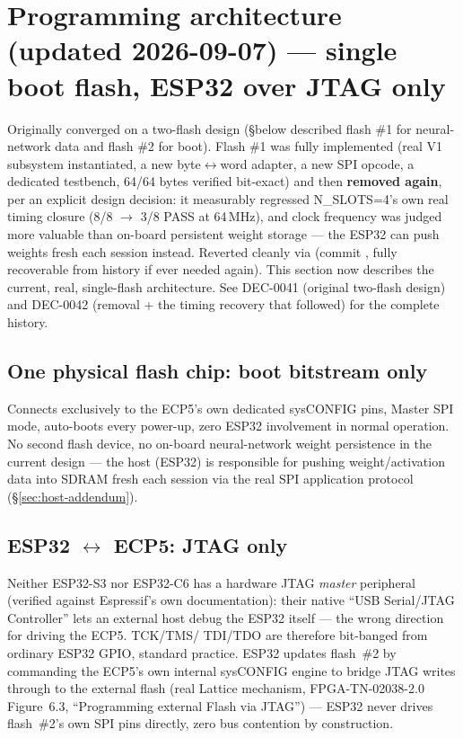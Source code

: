 \section{Programming architecture (updated 2026-09-07) --- single
boot flash, ESP32 over JTAG only}
\label{sec:prog-addendum}
\begin{fnwarn}
Originally converged on a two-flash design (\S below described flash
\#1 for neural-network data and flash \#2 for boot). Flash \#1 was
fully implemented (real V1 subsystem instantiated, a new byte$\leftrightarrow$word
adapter, a new SPI opcode, a dedicated testbench, 64/64 bytes verified
bit-exact) and then \textbf{removed again}, per an explicit design
decision: it measurably regressed N\_SLOTS=4's own real timing
closure (8/8 $\to$ 3/8 PASS at 64\,MHz), and clock frequency was
judged more valuable than on-board persistent weight storage --- the
ESP32 can push weights fresh each session instead. Reverted cleanly
via  (commit , fully recoverable from
history if ever needed again). This section now describes the
current, real, single-flash architecture. See 
DEC-0041 (original two-flash design) and DEC-0042 (removal + the
timing recovery that followed) for the complete history.
\end{fnwarn}

\subsection{One physical flash chip: boot bitstream only}
Connects exclusively to the ECP5's own dedicated sysCONFIG pins,
Master SPI mode, auto-boots every power-up, zero ESP32 involvement in
normal operation. No second flash device, no on-board neural-network
weight persistence in the current design --- the host (ESP32) is
responsible for pushing weight/activation data into SDRAM fresh each
session via the real SPI application protocol
(\S\ref{sec:host-addendum}).

\subsection{ESP32 $\leftrightarrow$ ECP5: JTAG only}
Neither ESP32-S3 nor ESP32-C6 has a hardware JTAG \emph{master}
peripheral (verified against Espressif's own documentation): their
native ``USB Serial/JTAG Controller'' lets an external host debug the
ESP32 itself --- the wrong direction for driving the ECP5. TCK/TMS/
TDI/TDO are therefore bit-banged from ordinary ESP32 GPIO, standard
practice. ESP32 updates flash~\#2 by commanding the ECP5's own
internal sysCONFIG engine to bridge JTAG writes through to the
external flash (real Lattice mechanism, FPGA-TN-02038-2.0 Figure~6.3,
``Programming external Flash via JTAG'') --- ESP32 never drives
flash~\#2's own SPI pins directly, zero bus contention by
construction.

